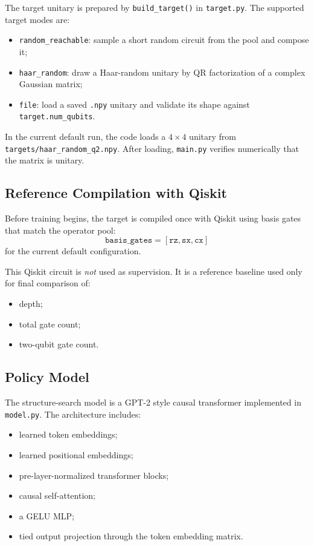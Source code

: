 \documentclass[11pt]{article}
\begin{document}
The target unitary is prepared by \texttt{build\_target()} in \texttt{target.py}. The supported target modes are:
\begin{itemize}[leftmargin=*]
\item \texttt{random\_reachable}: sample a short random circuit from the pool and compose it;
\item \texttt{haar\_random}: draw a Haar-random unitary by QR factorization of a complex Gaussian matrix;
\item \texttt{file}: load a saved \texttt{.npy} unitary and validate its shape against \texttt{target.num\_qubits}.
\end{itemize}

In the current default run, the code loads a $4\times 4$ unitary from \texttt{targets/haar\_random\_q2.npy}. After loading, \texttt{main.py} verifies numerically that the matrix is unitary.

\subsection{Reference Compilation with Qiskit}

Before training begins, the target is compiled once with Qiskit using basis gates that match the operator pool:
\[
\texttt{basis\_gates} = [\texttt{rz}, \texttt{sx}, \texttt{cx}]
\]
for the current default configuration.

This Qiskit circuit is \emph{not} used as supervision. It is a reference baseline used only for final comparison of:
\begin{itemize}[leftmargin=*]
\item depth;
\item total gate count;
\item two-qubit gate count.
\end{itemize}

\subsection{Policy Model}

The structure-search model is a GPT-2 style causal transformer implemented in \texttt{model.py}. The architecture includes:
\begin{itemize}[leftmargin=*]
\item learned token embeddings;
\item learned positional embeddings;
\item pre-layer-normalized transformer blocks;
\item causal self-attention;
\item a GELU MLP;
\item tied output projection through the token embedding matrix.
\end{itemize}
\end{document}
